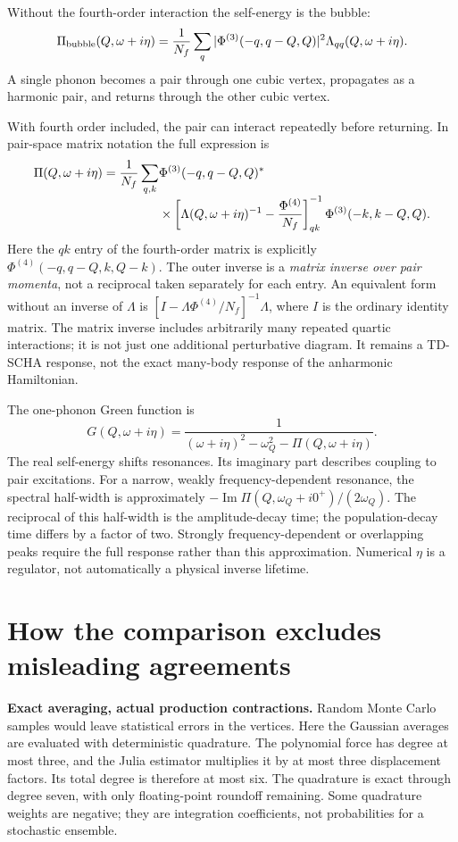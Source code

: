 \documentclass[11pt,a4paper]{article}
\newcommand{\pageheading}[1]{\clearpage\section{#1}}
\begin{document}
Without the fourth-order interaction the self-energy is the bubble:
\begin{equation}
 \Pi_{\rm bubble}(Q,\omega+i\eta)
 =\frac1{N_f}\sum_q
 |\Phi^{(3)}(-q,q-Q,Q)|^2\Lambda_{qq}(Q,\omega+i\eta).
\end{equation}
A single phonon becomes a pair through one cubic vertex, propagates as a
harmonic pair, and returns through the other cubic vertex.

With fourth order included, the pair can interact repeatedly before returning.
In pair-space matrix notation the full expression is
\begin{align}
 \Pi(Q,\omega+i\eta)=\frac1{N_f}\sum_{q,k}
 &\Phi^{(3)}(-q,q-Q,Q)^*\notag\\[-3pt]
 &\times\left[\Lambda(Q,\omega+i\eta)^{-1}
                -\frac{\Phi^{(4)}}{N_f}\right]^{-1}_{qk}
 \Phi^{(3)}(-k,k-Q,Q).
\end{align}
Here the $qk$ entry of the fourth-order matrix is explicitly
$\Phi^{(4)}(-q,q-Q,k,Q-k)$. The outer inverse is a \emph{matrix inverse over
pair momenta}, not a reciprocal taken separately for each entry. An equivalent
form without an inverse of $\Lambda$ is
$[I-\Lambda\Phi^{(4)}/N_f]^{-1}\Lambda$, where $I$ is the ordinary identity matrix.
The matrix inverse includes arbitrarily many repeated quartic interactions;
it is not just one additional perturbative diagram. It remains a TD-SCHA
response, not the exact many-body response of the anharmonic Hamiltonian.

The one-phonon Green function is
\begin{equation}
 G(Q,\omega+i\eta)
 =\frac{1}{(\omega+i\eta)^2-\omega_Q^2-\Pi(Q,\omega+i\eta)}.
\end{equation}
The real self-energy shifts resonances. Its imaginary part describes coupling
to pair excitations. For a narrow, weakly frequency-dependent resonance, the
spectral half-width is approximately
$-\operatorname{Im}\Pi(Q,\omega_Q+i0^+)/(2\omega_Q)$. The reciprocal of this
half-width is the amplitude-decay time; the population-decay time differs by
a factor of two. Strongly frequency-dependent or overlapping peaks require
the full response rather than this approximation. Numerical $\eta$ is a
regulator, not automatically a physical inverse lifetime.

\pageheading{How the comparison excludes misleading agreements}
\textbf{Exact averaging, actual production contractions.}
Random Monte Carlo samples would leave statistical errors in the vertices.
Here the Gaussian averages are evaluated with deterministic quadrature.
The polynomial force has degree at most three, and the Julia estimator
multiplies it by at most three displacement factors. Its total degree is
therefore at most six. The quadrature is exact through degree seven, with
only floating-point roundoff remaining. Some quadrature weights are negative;
they are integration coefficients, not probabilities for a stochastic ensemble.
\end{document}
